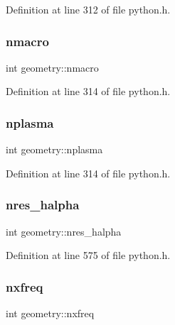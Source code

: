 Definition at line 312 of file python.\+h.

\mbox{\label{structgeometry_af6c5aca7a11b72347a7b12e8f50cc854}} 
\subsubsection{\texorpdfstring{nmacro}{nmacro}}
{\footnotesize\ttfamily int geometry\+::nmacro}



Definition at line 314 of file python.\+h.

\mbox{\label{structgeometry_a05ad401e559d8befe32c134cb5af4efa}} 
\subsubsection{\texorpdfstring{nplasma}{nplasma}}
{\footnotesize\ttfamily int geometry\+::nplasma}



Definition at line 314 of file python.\+h.

\mbox{\label{structgeometry_ae323a0d7e74050d8230c11c22f9e1981}} 
\subsubsection{\texorpdfstring{nres\+\_\+halpha}{nres\_halpha}}
{\footnotesize\ttfamily int geometry\+::nres\+\_\+halpha}



Definition at line 575 of file python.\+h.

\mbox{\label{structgeometry_ae7fb58fc78cd9fa02941f1996777efeb}} 
\subsubsection{\texorpdfstring{nxfreq}{nxfreq}}
{\footnotesize\ttfamily int geometry\+::nxfreq}



